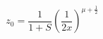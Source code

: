 \documentclass[12pt]{article}
\begin{document}
\begin{displaymath}
z_0 = \frac{1}{1+S} \left(\frac{1}{2x}\right)^{\mu+\frac{1}{2}}
\end{displaymath}
\end{document}
